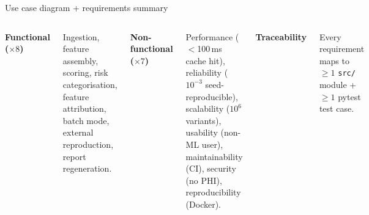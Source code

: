 \documentclass[aspectratio=169,10pt]{beamer}
\begin{document}
\begin{frame}{Use case diagram + requirements summary}
\begin{columns}[T]
{}

    \scriptsize
    \textbf{\textcolor{kkuGreen}{Functional ($\times 8$)}}\par
    Ingestion, feature assembly, scoring, risk categorisation, feature
    attribution, batch mode, external reproduction, report regeneration.

    \vspace{0.4em}
    \textbf{\textcolor{kkuGreen}{Non-functional ($\times 7$)}}\par
    Performance ($<$100\,ms cache hit), reliability ($10^{-3}$
    seed-reproducible), scalability ($10^{6}$ variants), usability
    (non-ML user), maintainability (CI), security (no PHI),
    reproducibility (Docker).

    \vspace{0.4em}
    \textbf{\textcolor{kkuGreen}{Traceability}}\par
    Every requirement maps to $\geq 1$ \texttt{src/} module +
    $\geq 1$ pytest test case.
  \end{columns}
\end{frame}
\end{document}

